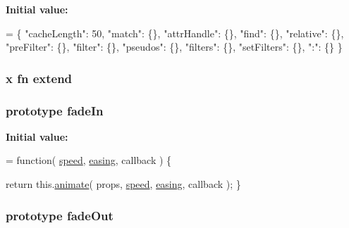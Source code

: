 {\bfseries Initial value\-:}
\begin{DoxyCode}
= \{ \textcolor{stringliteral}{"cacheLength"}: 50,
\textcolor{stringliteral}{"match"}: \{\},
\textcolor{stringliteral}{"attrHandle"}: \{\},
\textcolor{stringliteral}{"find"}: \{\},
\textcolor{stringliteral}{"relative"}: \{\},
\textcolor{stringliteral}{"preFilter"}: \{\},
\textcolor{stringliteral}{"filter"}: \{\},
\textcolor{stringliteral}{"pseudos"}: \{\},
\textcolor{stringliteral}{"filters"}: \{\},
\textcolor{stringliteral}{"setFilters"}: \{\},
\textcolor{stringliteral}{":"}: \{\} \}
\end{DoxyCode}
\hypertarget{jquery-1_810_82-vsdoc_8js_a84ade6b4c0a71f54664069487f2526dc}{
\subsubsection[{extend}]{ {\bf x} {\bf fn} extend}}\label{jquery-1_810_82-vsdoc_8js_a84ade6b4c0a71f54664069487f2526dc}
\hypertarget{jquery-1_810_82-vsdoc_8js_afd244940d1c307d34714250fc16cc7e8}{
\subsubsection[{fade\-In}]{ {\bf prototype} fade\-In}}\label{jquery-1_810_82-vsdoc_8js_afd244940d1c307d34714250fc16cc7e8}
{\bfseries Initial value\-:}
\begin{DoxyCode}
= \textcolor{keyword}{function}( \hyperlink{jquery-1_810_82-vsdoc_8js_add98c90065e6563cba26ff6d2016c46c}{speed}, \hyperlink{jquery-1_810_82-vsdoc_8js_a9758a312629fa6de1744280dd6e6253b}{easing}, callback ) \{


        \textcolor{keywordflow}{return} this.\hyperlink{jquery-1_810_82-vsdoc_8js_a956a1d08128d41115c45b6815814a64d}{animate}( props, \hyperlink{jquery-1_810_82-vsdoc_8js_add98c90065e6563cba26ff6d2016c46c}{speed}, \hyperlink{jquery-1_810_82-vsdoc_8js_a9758a312629fa6de1744280dd6e6253b}{easing}, callback );
    \}
\end{DoxyCode}
\hypertarget{jquery-1_810_82-vsdoc_8js_ab5b944777329a41646b2c3d6f26af153}{
\subsubsection[{fade\-Out}]{ {\bf prototype} fade\-Out}}\label{jquery-1_810_82-vsdoc_8js_ab5b944777329a41646b2c3d6f26af153}
